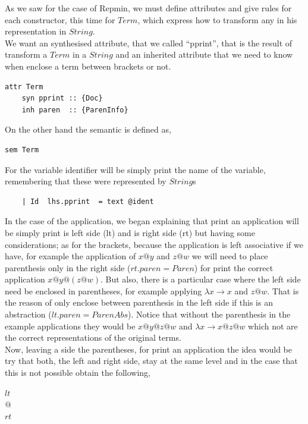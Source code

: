 \documentclass[a4paper,10pt]{article}
\begin{document}
As we saw for the case of Repmin, we must define attributes and give rules for
each constructor, this time for $Term$, which express how to transform any
in his representation in $String$.\\

We want an synthesised attribute, that we called ``pprint'', that is the result
of transform a $Term$ in a $String$ and an inherited attribute that we need to
know when enclose a term between brackets or not.

\begin{lstlisting}
attr Term 
    syn pprint :: {Doc}
    inh paren  :: {ParenInfo}
\end{lstlisting}

\noindent On the other hand the semantic is defined as,

\begin{lstlisting}    
sem Term
\end{lstlisting}
For the variable identifier will be simply print the name of the variable, remembering
that these were represented by $String$s
\begin{lstlisting}    
    | Id  lhs.pprint  = text @ident
\end{lstlisting}

In the case of the application, we began explaining that print an application will
be simply print is left side (lt) and is right side (rt) but having some considerations;
as for the brackets, because the application is left associative if we have, for example
the application of $x@y$ and $z@w$ we will need to place parenthesis only in the right side
($rt.paren = Paren$) for print the correct application $x@y@(z@w)$. But also, there is
a particular case where the left side need be enclosed in parentheses, for example
applying $\lambda x \rightarrow x$ and $z@w$. That is the reason of only enclose between
parenthesis in the left side if this is an abstraction ($lt.paren = ParenAbs$).
Notice that without the parenthesis in the example applications they would be $x@y@z@w$ and
$\lambda x \rightarrow x@z@w$ which not are the correct representations of the original
terms.\\

Now, leaving a side the parentheses, for print an application the idea would be try that
both, the left and right side, stay at the same level and in the case that this is not
possible obtain the following,

\begin{center}
$lt$\\
$@$\\
$rt$
\end{center}
\end{document}
